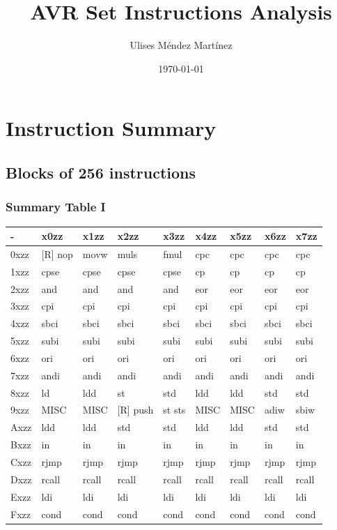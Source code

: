 \documentclass{beamer}
\title[AVR Set Instructions Analysis]{AVR Set Instructions Analysis} %
\author{Ulises M\'endez Mart\'{i}nez} %
\institute[UAG] %
{
Universidad Aut\'onoma de Guadalajara  \\ %
\medskip
\textit{ulisesmdzmtz@gmail.com} %
}
\date{\today} %
\begin{document}
\begin{frame}
\titlepage %
\end{frame}



\section{Instruction Summary} 
\subsection{Blocks of 256 instructions}
\begin{frame}
\frametitle{Summary Table I}
\small
\begin{center}
    \begin{tabular}{| l | l | l | l | l | l | l | l | l |}
    \hline
    - & x0zz & x1zz & x2zz & x3zz & x4zz & x5zz & x6zz & x7zz \\    \hline
    0xzz & [R] nop & movw & muls & fmul & cpc & cpc & cpc  & cpc \\ \hline
    1xzz & cpse & cpse & cpse & cpse & cp & cp & cp & cp \\ \hline
    2xzz & and & and & and & and & eor & eor & eor & eor \\ \hline
    3xzz & cpi & cpi & cpi & cpi & cpi & cpi & cpi & cpi \\ \hline
    4xzz & sbci & sbci & sbci & sbci & sbci & sbci & sbci & sbci \\ \hline
    5xzz & subi & subi & subi & subi & subi & subi & subi & subi \\ \hline
    6xzz & ori & ori & ori & ori & ori & ori & ori & ori \\ \hline
    7xzz & andi & andi & andi & andi & andi & andi & andi & andi \\ \hline
    8xzz & ld & ldd & st & std & ldd & ldd & std & std \\ \hline
    9xzz & MISC & MISC & [R] push &  st sts & MISC & MISC & adiw & sbiw \\ \hline
    Axzz & ldd & ldd & std & std & ldd & ldd & std  & std \\ \hline
    Bxzz & in & in & in & in & in & in & in & in \\ \hline
    Cxzz & rjmp & rjmp & rjmp & rjmp & rjmp & rjmp & rjmp & rjmp \\ \hline
    Dxzz & rcall & rcall & rcall & rcall & rcall & rcall & rcall & rcall \\ \hline
    Exzz & ldi & ldi & ldi & ldi & ldi & ldi & ldi & ldi \\ \hline
    Fxzz & cond & cond & cond & cond & cond & cond & cond & cond \\ \hline
    \end{tabular}
\end{center}
\end{frame}
\end{document}
